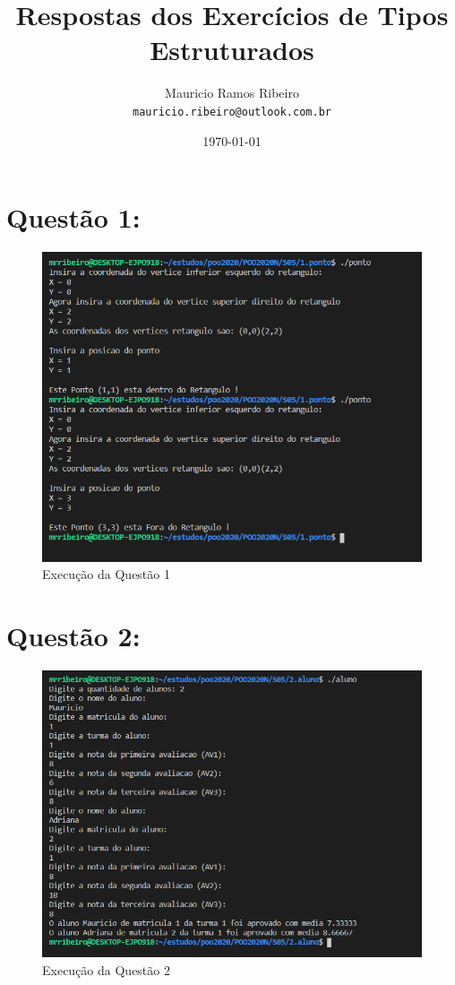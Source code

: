 \documentclass{article}
\author{
  Mauricio Ramos Ribeiro\\
  \texttt{mauricio.ribeiro@outlook.com.br}
}
\title{Respostas dos Exercícios de Tipos Estruturados}
\date{\today}
\begin{document}
\maketitle

\vspace{15mm}


\section*{Questão 1:}

\begin{figure}[h!]
  \includegraphics[scale=0.7]{ponto.png}
  \caption{Execução da Questão 1}
\end{figure}
\vspace{15mm}

\section*{Questão 2:}

\begin{figure}[h!]
  \includegraphics[scale=0.7]{aluno.png}
  \caption{Execução da Questão 2}
  \end{figure}
\vspace{15mm}
\end{document}
